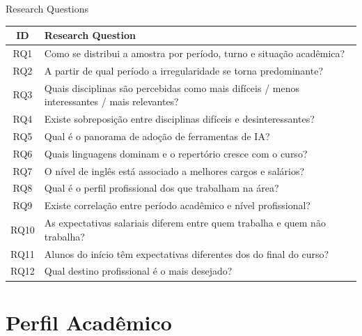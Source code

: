 \documentclass[fleqn]{beamer}
\begin{document}
\begin{frame}{Research Questions}
\scriptsize{
\begin{tabular}{cl}
\toprule
\textbf{ID} & \textbf{Research Question} \\
\midrule
RQ1 & Como se distribui a amostra por período, turno e situação acadêmica? \\
RQ2 & A partir de qual período a irregularidade se torna predominante? \\
RQ3 & Quais disciplinas são percebidas como mais difíceis / menos interessantes / mais relevantes? \\
RQ4 & Existe sobreposição entre disciplinas difíceis e desinteressantes? \\
RQ5 & Qual é o panorama de adoção de ferramentas de IA? \\
RQ6 & Quais linguagens dominam e o repertório cresce com o curso? \\
RQ7 & O nível de inglês está associado a melhores cargos e salários? \\
RQ8 & Qual é o perfil profissional dos que trabalham na área? \\
RQ9 & Existe correlação entre período acadêmico e nível profissional? \\
RQ10 & As expectativas salariais diferem entre quem trabalha e quem não trabalha? \\
RQ11 & Alunos do início têm expectativas diferentes dos do final do curso? \\
RQ12 & Qual destino profissional é o mais desejado? \\
\bottomrule
\end{tabular}
}
\end{frame}

\section{Perfil Acadêmico}
\end{document}
